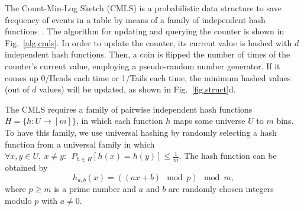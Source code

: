 The Count-Min-Log Sketch (CMLS) is a probabilistic data structure to save frequency of events in a table by means of a family of independent hash functions~\cite{pitel2015count}. The algorithm for updating and querying the counter is shown in Fig.~\ref{alg.cmls}. In order to update the counter, its current value is hashed with $d$ independent hash functions. Then, a coin is flipped the number of times of the counter's current value, employing a pseudo-random number generator. If it comes up 0/Heads each time or 1/Tails each time, the minimum hashed values (out of $d$ values) will be updated, as shown in Fig.~\ref{fig.struct}d.

The CMLS requires a family of pairwise independent hash functions
$H = \{h: U \to [m]\}$, in which each function $h$ maps some universe $U$ to $m$ bins. 
To have this family, we use universal hashing by randomly selecting a hash function from a universal family in which $\forall x,y\in U,~x\neq y:~~P_{h\in H}[h(x)=h(y)]\leq \frac{1}{m}$.
The hash function can be obtained by
\begin{equation}
  h_{a,b}(x)=\left((ax+b)~\bmod p\right)~\bmod m,
\end{equation}
where $p\ge m$ is a prime number and $a$ and $b$ are randomly chosen integers modulo $p$ with $a\neq 0$.

